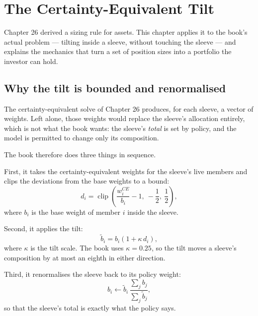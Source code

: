 
\chapter{The Certainty-Equivalent Tilt}
\label{ch:tilt}

Chapter 26 derived a sizing rule for assets. This chapter applies it to
the book's actual problem --- tilting inside a sleeve, without touching
the sleeve --- and explains the mechanics that turn a set of position
sizes into a portfolio the investor can hold.

\section{Why the tilt is bounded and renormalised}

The certainty-equivalent solve of Chapter 26 produces, for each sleeve, a
vector of weights. Left alone, those weights would replace the sleeve's
allocation entirely, which is not what the book wants: the sleeve's
\emph{total} is set by policy, and the model is permitted to change only
its composition.

The book therefore does three things in sequence.

First, it takes the certainty-equivalent weights for the sleeve's live
members and clips the deviations from the base weights to a bound:
\begin{equation}
d_i = \operatorname{clip}\!\left(
  \frac{w_i^{CE}}{b_i} - 1,\ -\frac{1}{2},\ \frac{1}{2}\right),
\end{equation}
where \(b_i\) is the base weight of member \(i\) inside the sleeve.

Second, it applies the tilt:
\begin{equation}
\tilde{b}_i = b_i\left(1 + \kappa\, d_i\right),
\end{equation}
where \(\kappa\) is the tilt scale. The book uses \(\kappa = 0.25\), so the
tilt moves a sleeve's composition by at most an eighth in either
direction.

Third, it renormalises the sleeve back to its policy weight:
\begin{equation}
b_i \leftarrow \tilde{b}_i\,\frac{\sum_j b_j}{\sum_j \tilde{b}_j},
\end{equation}
so that the sleeve's total is exactly what the policy says.

